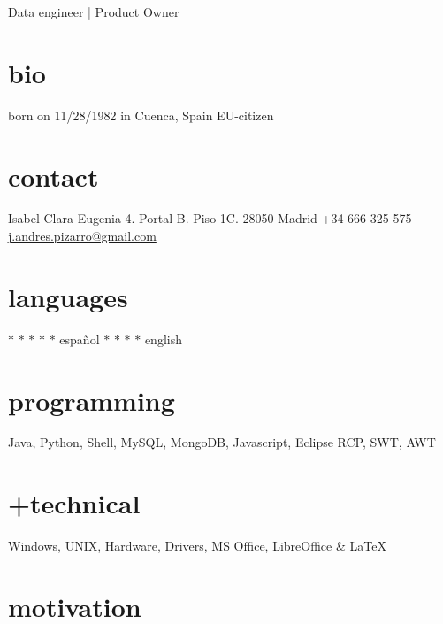 \documentclass[]{friggeri-cv}
\begin{document}
       {Data engineer | Product Owner}



\begin{aside} %
  \section{bio}
  born on 11/28/1982
  in Cuenca, Spain
  EU-citizen
  \section{contact}
  Isabel Clara Eugenia 4. 
  Portal B. Piso 1C.
  28050 Madrid
  +34 666 325 575
  \hyperref[mailto:j.andres.pizarro@gmail.com]{j.andres.pizarro@gmail.com}
  \section{languages}
  {\color{lightgray} $\ast$}{\color{lightgray} $\ast$}{\color{lightgray} $\ast$}{\color{lightgray} $\ast$}{\color{lightgray} $\ast$} español
  {\color{lightgray} $\ast$}{\color{lightgray} $\ast$}{\color{lightgray} $\ast$}{\color{lightgray} $\ast$} english
  \section{programming}
  Java, Python, Shell,
  MySQL, MongoDB, Javascript,
  Eclipse RCP, SWT, AWT
  \section{ +technical}
  Windows, UNIX,
  Hardware, Drivers,
  MS Office, LibreOffice \& \LaTeX
\end{aside}


\section{motivation}
\end{document}

